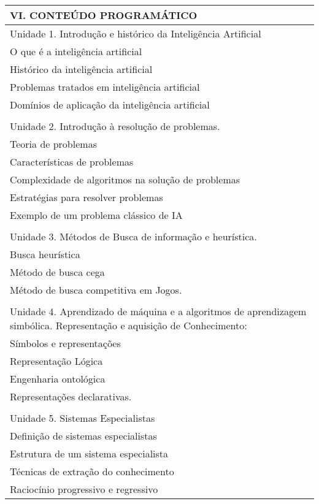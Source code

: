 \documentclass[12pt]{article}
\begin{document}
\newpage
\begin{longtable}{|L{1.025\textwidth}|} \hline
%
{\bf VI. CONTEÚDO PROGRAMÁTICO } \\ \hline

Unidade 1. Introdução e histórico da Inteligência Artificial\\
O que é a inteligência artificial\\
 Histórico da inteligência artificial\\
 Problemas tratados em inteligência artificial\\
 Domínios de aplicação da inteligência artificial\\
\\
Unidade 2. Introdução à resolução de problemas.\\
 Teoria de problemas\\
 Características de problemas\\
 Complexidade de algoritmos na solução de problemas\\
              Estratégias para resolver problemas\\
             Exemplo de um problema clássico de IA\\
\\
Unidade 3. Métodos de Busca de informação e heurística.\\
Busca heurística \\
Método de busca cega\\
Método de busca competitiva em Jogos.\\
\\
Unidade 4. Aprendizado de máquina e a algoritmos de aprendizagem simbólica. Representação e aquisição de Conhecimento:\\
           Símbolos e representações\\
            Representação Lógica \\
            Engenharia ontológica\\
            Representações declarativas.\\
\\
Unidade 5. Sistemas Especialistas \\
            Definição de sistemas especialistas\\
            Estrutura de um  sistema especialista\\
            Técnicas de extração do conhecimento\\
            Raciocínio progressivo e regressivo\\

\end{longtable}
\end{document}
